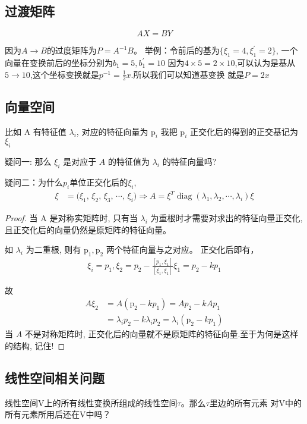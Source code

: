 \subsection{过渡矩阵}

\[AX = BY\]

因为$A\to B$的过度矩阵为$P = A^{-1}B$。
举例：令前后的基为$\{\xi_1 = 4, \xi_1^{'} = 2\}$, 一个向量在变换前后的坐标分别为$b_1 = 5, b_1^{'} = 10$
因为$4\times 5 = 2\times 10$,可以认为是基从$5\to10$,这个坐标变换就是$p^{-1} = \frac{1}{2}x$.所以我们可以知道基变换
就是$P = 2x$

\subsection{向量空间}
比如 $\mathrm{A}$ 有特征值 $\lambda_i$, 对应的特征向量为 $\mathrm{p}_i$
我把 $\mathrm{p}_i$ 正交化后的得到的正交基记为 $\xi_i$

疑问一: 那么 $\xi_i$ 是对应于 $A$ 的特征值为 $\lambda_i$ 的特征向量吗? 

疑问二：为什么$p_i$单位正交化后的$\xi_i$, 
\begin{align*}
    \xi 
    & = \biggl(\xi_1,\, \xi_2,\, \xi_3,\, \cdots,\, \xi_i\biggr)
      \Longrightarrow  A=\xi^T \operatorname{diag}\left(\lambda_1, \lambda_2, \cdots, \lambda_i\right) \xi
\end{align*}

\begin{proof}

当 $\mathrm{A}$ 是对称实矩阵时, 只有当 $\lambda_i$ 为重根时才需要对求出的特征向量正交化, 且正交化后的向量仍然是原矩阵的特征向量。

如 $\lambda_i$ 为二重根, 则有 $\mathrm{p}_1, \mathrm{p}_2$ 两个特征向量与之对应。
正交化后即有，
\begin{align*}
    \xi_i=p_1, \xi_2=p_2-\frac{[p_1,\xi_1]}{[\xi_1,\xi_1]}\xi_1=p_2-kp_1
\end{align*}

故 
\begin{align*}
    A \xi_2
    & = A\left(\mathrm{p}_2-k p_1\right)=A p_2-k A p_1 \\
    & =\lambda_i p_2-k \lambda_i p_2 = \lambda_i\left(\mathrm{p}_2-k p_1\right)
\end{align*}
当 $A$ 不是对称矩阵时, 正交化后的向量就不是原矩阵的特征向量.至于为何是这样的结构, 记住!
\end{proof}

\subsection{线性空间相关问题}
线性空间V上的所有线性变换所组成的线性空间$\tau$。那么$\tau$里边的所有元素
对V中的所有元素所用后还在V中吗？

